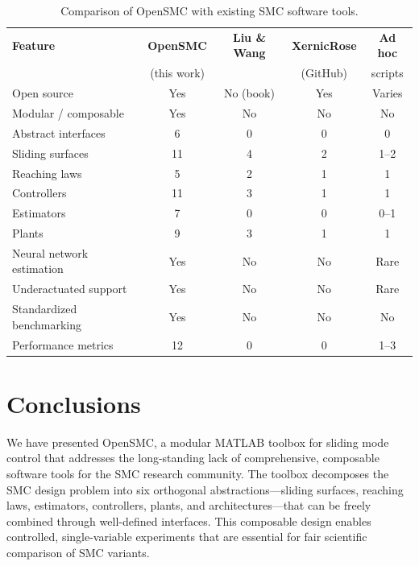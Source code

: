 \documentclass[preprint,12pt]{elsarticle}
\begin{document}
\begin{table}[t]
\centering
\small
\caption{Comparison of OpenSMC with existing SMC software tools.}
\label{tab:comparison}
\begin{tabular}{lcccc}
\toprule
\textbf{Feature} & \textbf{OpenSMC} & \textbf{Liu \& Wang} & \textbf{XernicRose} & \textbf{Ad hoc} \\
                  & (this work)       & \cite{liu2013advanced} & (GitHub)           & scripts \\
\midrule
Open source                  & Yes  & No (book)  & Yes & Varies \\
Modular / composable         & Yes  & No         & No  & No     \\
Abstract interfaces          & 6    & 0          & 0   & 0      \\
Sliding surfaces             & 11   & 4          & 2   & 1--2   \\
Reaching laws                & 5    & 2          & 1   & 1      \\
Controllers                  & 11   & 3          & 1   & 1      \\
Estimators                   & 7    & 0          & 0   & 0--1   \\
Plants                       & 9    & 3          & 1   & 1      \\
Neural network estimation    & Yes  & No         & No  & Rare   \\
Underactuated support        & Yes  & No         & No  & Rare   \\
Standardized benchmarking    & Yes  & No         & No  & No     \\
Performance metrics          & 12   & 0          & 0   & 1--3   \\
\bottomrule
\end{tabular}
\end{table}


\section{Conclusions}
\label{sec:conclusions}

We have presented OpenSMC, a modular MATLAB toolbox for sliding mode control that addresses the long-standing lack of comprehensive, composable software tools for the SMC research community. The toolbox decomposes the SMC design problem into six orthogonal abstractions---sliding surfaces, reaching laws, estimators, controllers, plants, and architectures---that can be freely combined through well-defined interfaces. This composable design enables controlled, single-variable experiments that are essential for fair scientific comparison of SMC variants.
\end{document}
